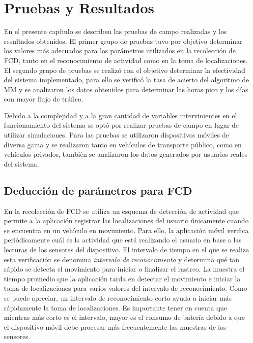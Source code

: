 \chapter{Pruebas y Resultados}
\label{cap:7}

En el presente capítulo se describen las pruebas de campo realizadas y los resultados obtenidos. El primer grupo de pruebas tuvo por objetivo determinar los valores más adecuados para los parámetros utilizados en la recolección de FCD, tanto en el reconocimiento de actividad como en la toma de localizaciones. El segundo grupo de pruebas se realizó con el objetivo determinar la efectividad del sistema implementado, para ello se verificó la tasa de acierto del algoritmo de MM y se analizaron los datos obtenidos para determinar las horas pico y los días con mayor flujo de tráfico.

Debido a la complejidad y a la gran cantidad de variables intervinientes en el funcionamiento del sistema se optó por realizar pruebas de campo en lugar de utilizar simulaciones. Para las pruebas se utilizaron dispositivos móviles de diversa gama y se realizaron tanto en vehículos de transporte público, como en vehículos privados, también se analizaron los datos generados por usuarios reales del sistema. 

\section{Deducción de parámetros para FCD}

En la recolección de FCD se utiliza un esquema de detección de actividad que permite a la aplicación registrar las localizaciones del usuario únicamente cuando se encuentra en un vehículo en movimiento. Para ello, la aplicación móvil verifica periódicamente cuál es la actividad que está realizando el usuario en base a las lecturas de los sensores del dispositivo. El intervalo de tiempo en el que se realiza esta verificación se denomina \emph{intervalo de reconocimiento} y determina qué tan rápido se detecta el movimiento para iniciar o finalizar el rastreo. La  muestra el tiempo promedio que la aplicación tarda en detectar el movimiento e iniciar la toma de localizaciones para varios valores del intervalo de reconocimiento. Como se puede apreciar, un intervalo de reconocimiento corto ayuda a iniciar más rápidamente la toma de localizaciones. Es importante tener en cuenta que mientras más corto es el intervalo, mayor es el consumo de batería debido a que el dispositivo móvil debe procesar más frecuentemente las muestras de los sensores.

